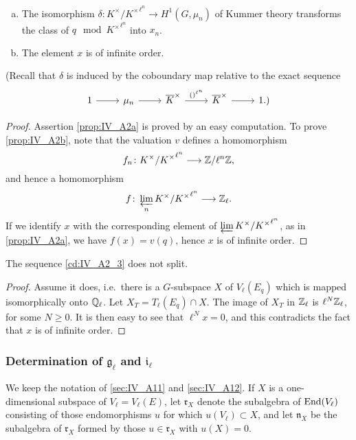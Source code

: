 \begin{subappendices}
\begin{prop}
\begin{enumerate}[(a)]
	\item\label{prop:IV_A2a}
		The isomorphism $\delta \colon K^\times/{K^\times}^{\ell^n} \to
		H^1(G, \mu_n)$ of Kummer theory transforms the class of $q
		\mod{ {K^\times}^{\ell^n} }$ into $x_n$.
	\item\label{prop:IV_A2b}
		The element $x$ is of infinite order.
\end{enumerate}
\end{prop}
(Recall that $\delta$ is induced by the coboundary map relative to
the exact sequence
\[\begin{tikzcd}
	1 \rar & \mu_n \rar & {\algcl K}^\times \rar["()^{\ell^n}"] &
	{\algcl K}^\times \rar & 1.)
\end{tikzcd}\]
\begin{proof}
	Assertion \ref{prop:IV_A2a} is proved by an easy computation. To prove
	\ref{prop:IV_A2b}, note that the valuation $v$ defines a homomorphism
	\[
		f_n \colon K^\times/{K^\times}^{\ell^n} \longrightarrow
		\mathbb{Z}/\ell^n\mathbb{Z},
	\]
	and hence a homomorphism
	\[
		f \colon \varprojlim_n K^\times/{K^\times}^{\ell^n} \longrightarrow
		\mathbb{Z}_\ell.
	\]
	If we identify $x$ with the corresponding element of $\varprojlim
	K^\times/{K^\times}^{\ell^n}$, as in \ref{prop:IV_A2a}, we have $f(x) =
	v(q)$, hence $x$ is of infinite order.
\end{proof}

\begin{corp}
	The sequence \eqref{cd:IV_A2_3} does not split.
\end{corp}
\begin{proof}
	Assume it does, i.e.\ there is a $G$-subspace $X$ of $V_\ell(E_q)$
	which is mapped isomorphically onto $\mathbb{Q}_\ell$. Let $X_T = T_\ell(E_q)
	\cap X$.  The image of $X_T$ in $\mathbb{Z}_\ell$ is $\ell^N\mathbb{Z}_\ell$, for some
	$N \ge 0$. It is then easy to see that $\ell^N x = 0$, and this
	contradicts the fact that $x$ is of
	\dpage
	infinite order.
\end{proof}

\subsubsection{Determination of \texorpdfstring{$\mathfrak{g}_\ell$}{gℓ} and
\texorpdfstring{$\mathfrak{i}_\ell$}{iℓ}}
\label{sec:IV_A13}
We keep the notation of \ref{sec:IV_A11} and \ref{sec:IV_A12}. If $X$ is a
one-dimensional subspace of $V_\ell = V_\ell(E)$, let $\mathfrak{r}_X$ denote
the subalgebra of $\operatorname{End}(V_\ell)$ consisting of those endomorphisms $u$ for
which $u(V_\ell) \subset X$, and let $\mathfrak{n}_X$ be the subalgebra of
$\mathfrak{r}_X$ formed by those $u \in \mathfrak{r}_X$ with $u(X) = 0$.


\end{subappendices}
